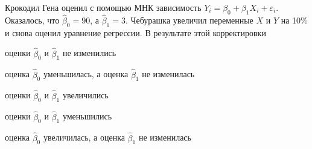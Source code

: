 
\begin{question}
Крокодил Гена оценил с помощью МНК зависимость
\(Y_i = \beta_0 + \beta_1 X_i + \varepsilon_i\). Оказалось, что
\(\hat \beta_0 = 90\), а \(\hat\beta_1 = 3\). Чебурашка увеличил
переменные \(X\) и \(Y\) на 10\% и снова оценил уравнение регрессии. В
результате этой корректировки
\begin{answerlist}
  \item оценки \(\hat\beta_0\) и \(\hat\beta_1\) не изменились
  \item оценка \(\hat\beta_0\) уменьшилась, а оценка \(\hat\beta_1\) не
изменилась
  \item оценки \(\hat\beta_0\) и \(\hat\beta_1\) увеличились
  \item оценки \(\hat\beta_0\) и \(\hat\beta_1\) уменьшились
  \item оценка \(\hat\beta_0\) увеличилась, а оценка \(\hat\beta_1\) не
изменилась
\end{answerlist}
\end{question}


